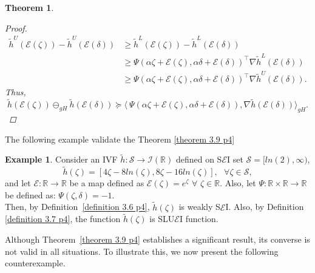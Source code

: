 \documentclass[12pt, reqno]{amsart}
\newtheorem{theorem}{Theorem}[section]
\theoremstyle{definition}
\newtheorem{example}{Example}[section]
\theoremstyle{remark}
\numberwithin{equation}{section}
\begin{document}
\begin{theorem}
\begin{proof}
\begin{equation*}
    \begin{aligned}
        \tilde{h}^U(\mathcal{\mathcal{E}}(\mathit{\zeta} )) - \tilde{h}^U(\mathcal{\mathcal{E}}(\mathit{\delta} )) 
&\geq \tilde{h}^L(\mathcal{\mathcal{E}}(\mathit{\zeta} )) - \tilde{h}^L(\mathcal{\mathcal{E}}(\mathit{\delta} )) \\
&\geq \Psi(\alpha \mathit{\zeta} +\mathcal{\mathcal{E}}(\mathit{\zeta} ),\alpha \mathit{\delta} +\mathcal{\mathcal{E}}(\mathit{\delta} ))^{\!\top}\nabla \tilde{h}^L(\mathcal{\mathcal{E}}(\mathit{\delta} )) \\
&\geq \Psi(\alpha \mathit{\zeta} +\mathcal{\mathcal{E}}(\mathit{\zeta} ),\alpha \mathit{\delta} +\mathcal{\mathcal{E}}(\mathit{\delta} ))^{\!\top}\nabla \tilde{h}^U(\mathcal{\mathcal{E}}(\mathit{\delta} )).
    \end{aligned}
\end{equation*}
Thus,
\begin{equation*}
   \tilde{h}(\mathcal{\mathcal{E}}(\mathit{\zeta} )) \ominus_{gH}\tilde{h}(\mathcal{\mathcal{E}}(\mathit{\delta} )) \succeq \langle\ {\Psi}( {\alpha} \mathit{\zeta} + \mathcal{\mathcal{E}}(\mathit{\zeta} ), {\alpha}\mathit{\delta} + \mathcal{\mathcal{E}}(\mathit{\delta} )),\nabla  \tilde{h}( \mathcal{\mathcal{E}}(\mathit{\delta} ))\rangle_{gH}.
\end{equation*}

\end{proof}
\end{theorem}
The following example validate the Theorem \ref{theorem 3.9 p4}

 \begin{example}
     Consider an IVF $\tilde{h}: \mathcal{S} \to \mathcal{I}(\mathbb{R})$ defined on S$\mathcal{\mathcal{E}}$I set $\mathcal{S}=[ln(2),\infty)$,
   \begin{equation*}
       \tilde{h}(\mathit{\zeta} )=[4\mathit{\zeta} -8ln(\mathit{\zeta} ),8\mathit{\zeta} -16ln(\mathit{\zeta} )] , ~~~\forall \mathit{\zeta}  \in \mathcal{S},
   \end{equation*}   
and let $\mathcal{\mathcal{E}}:\mathbb{R} \to\mathbb{R}$ be a map defined as $\mathcal{\mathcal{E}}(\mathit{\zeta} ) = e^{\mathit{\zeta} }$ $\forall$ $\mathit{\zeta}  \in \mathbb{R}$.
Also, let $\Psi: \mathbb{R} \times \mathbb{R} \to \mathbb{R}$ be defined as:
    $\Psi(\mathit{\zeta} ,\mathit{\delta} )=-1$.\\ 
Then, by Definition~\ref{definition 3.6 p4}, $\tilde{h}(\zeta)$ is weakly S$\mathcal{\mathcal{E}}$I. Also, by Definition \ref{definition 3.7 p4}, the function $\tilde{h}(\zeta)$ is SLU$\mathcal{\mathcal{E}}$I function. 
 \end{example} 
Although Theorem~\ref{theorem 3.9 p4} establishes a significant result, its converse is not valid in all situations. To illustrate this, we now present the following counterexample.
\end{document}
